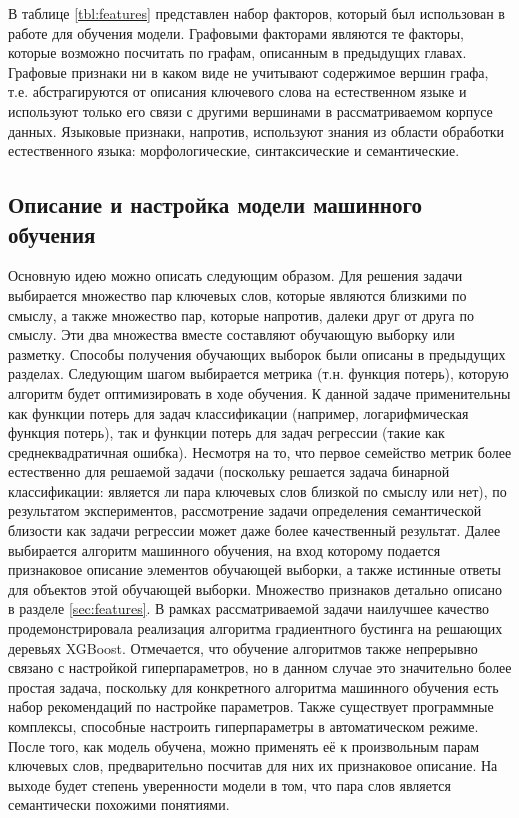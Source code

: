В таблице \ref{tbl:features} представлен набор факторов, который был использован в работе для обучения модели. Графовыми факторами являются те факторы, которые возможно посчитать по графам, описанным в предыдущих главах. Графовые признаки ни в каком виде не учитывают содержимое вершин графа, т.е. абстрагируются от описания ключевого слова на естественном языке и используют только его связи с другими вершинами в рассматриваемом корпусе данных. Языковые признаки, напротив, используют знания из области обработки естественного языка: морфологические, синтаксические и семантические.

\subsection{Описание и настройка модели машинного обучения} \label{sec:model}
Основную идею можно описать следующим образом. Для решения задачи выбирается множество пар ключевых слов, которые являются близкими по смыслу, а также множество пар, которые напротив, далеки друг от друга по смыслу. Эти два множества вместе составляют обучающую выборку или разметку. Способы получения обучающих выборок были описаны в предыдущих разделах. Следующим шагом выбирается метрика (т.н. функция потерь), которую алгоритм будет оптимизировать в ходе обучения. К данной задаче применительны как функции потерь для задач классификации (например, логарифмическая функция потерь), так и функции потерь для задач регрессии (такие как среднеквадратичная ошибка). Несмотря на то, что первое семейство метрик более естественно для решаемой  задачи (поскольку решается задача бинарной классификации: является ли пара ключевых слов близкой по смыслу или нет), по результатом экспериментов, рассмотрение задачи определения семантической близости как задачи регрессии может даже более качественный результат. Далее выбирается алгоритм машинного обучения, на вход которому подается признаковое описание элементов обучающей выборки, а также истинные ответы для объектов этой обучающей выборки. Множество признаков детально описано в разделе \ref{sec:features}. В рамках рассматриваемой задачи наилучшее качество продемонстрировала реализация алгоритма градиентного бустинга на решающих деревьях XGBoost. Отмечается, что обучение алгоритмов также непрерывно связано с настройкой гиперпараметров, но в данном случае это значительно более простая задача, поскольку для конкретного алгоритма машинного обучения есть набор рекомендаций по настройке параметров. Также существует программные комплексы, способные настроить гиперпараметры в автоматическом режиме. После того, как модель обучена, можно применять её к произвольным парам ключевых слов, предварительно посчитав для них их признаковое описание. На выходе будет степень уверенности модели в том, что пара слов является семантически похожими понятиями.



